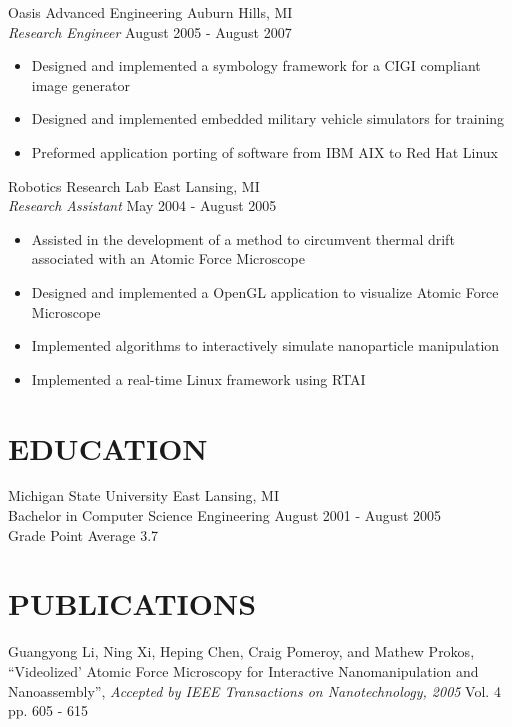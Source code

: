 \documentclass[line]{res}
\begin{document}
\begin{resume}
    \vspace{-2mm}
    Oasis Advanced Engineering \hfill Auburn Hills, MI\\
    {\sl Research Engineer} \hfill August 2005 - August 2007
    \vspace{1mm}
    \begin{itemize}
      \item Designed and implemented a symbology framework for a CIGI compliant image generator
      \item Designed and implemented embedded military vehicle simulators for training
      \item Preformed application porting of software from IBM AIX to Red Hat Linux 
    \end{itemize}

    \vspace{-2mm}
    Robotics Research Lab \hfill East Lansing, MI\\
    {\sl Research Assistant} \hfill May 2004 - August 2005
    \vspace{1mm}
    \begin{itemize}
      \item Assisted in the development of a method to circumvent thermal drift associated with an Atomic Force Microscope
      \item Designed and implemented a OpenGL application to visualize Atomic Force Microscope
      \item Implemented algorithms to interactively simulate nanoparticle manipulation
      \item Implemented a real-time Linux framework using RTAI
    \end{itemize}

\section{EDUCATION}
\vspace{1mm}
   Michigan State University \hfill East Lansing, MI\\
   Bachelor in Computer Science Engineering \hfill August 2001 - August 2005\\
   Grade Point Average 3.7\\

\vspace{-5mm}
\section{PUBLICATIONS}
   \vspace{1mm}
   Guangyong Li, Ning Xi, Heping Chen, Craig Pomeroy, and Mathew Prokos,
   ``Videolized' Atomic Force Microscopy for Interactive Nanomanipulation and Nanoassembly'',
   \textsl{Accepted by IEEE Transactions on Nanotechnology, 2005} Vol. 4 pp. 605 - 615


\end{resume}
\end{document}
